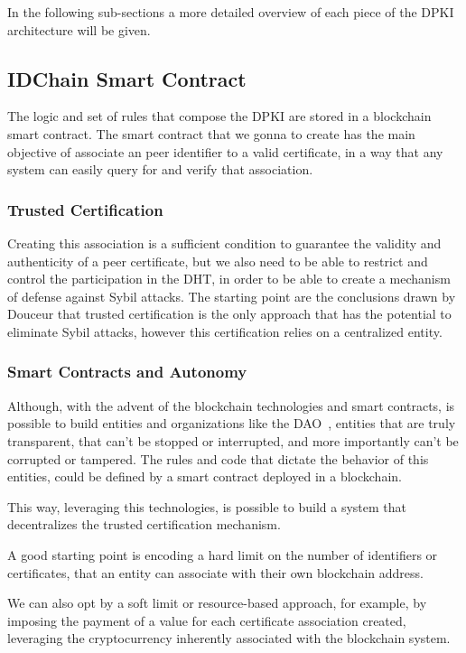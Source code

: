 In the following sub-sections a more detailed overview of each piece of the \ac{DPKI} architecture will be given.

\subsection{IDChain Smart Contract}

The logic and set of rules that compose the \ac{DPKI} are stored in a blockchain smart contract.
The smart contract that we gonna to create has the main objective of associate an peer identifier to a valid certificate, in a way that any system can easily query for and verify that association.

\subsubsection{Trusted Certification}
Creating this association is a sufficient condition to guarantee the validity and authenticity of a peer certificate, but we also need to be able to restrict and control the participation in the \ac{DHT}, in order to be able to create a mechanism of defense against Sybil attacks.
The starting point are the conclusions drawn by Douceur\cite{Douceur2002} that trusted certification is the only approach that has the potential to eliminate Sybil attacks, however this certification relies on a centralized entity.

\subsubsection{Smart Contracts and Autonomy}
Although, with the advent of the blockchain technologies and smart contracts, is possible to build entities and organizations like the DAO~\cite{ralphc.merkle2016}, entities that are truly transparent, that can't be stopped or interrupted, and more importantly can't be corrupted or tampered.
The rules and code that dictate the behavior of this entities, could be defined by a smart contract deployed in a blockchain.

This way, leveraging this technologies, is possible to build a system that decentralizes the trusted certification mechanism.

A good starting point is encoding a hard limit on the number of identifiers or certificates, that an entity can associate with their own blockchain address.

We can also opt by a soft limit or resource-based approach, for example, by imposing the payment of a value for each certificate association created, leveraging the cryptocurrency inherently associated with the blockchain system.

